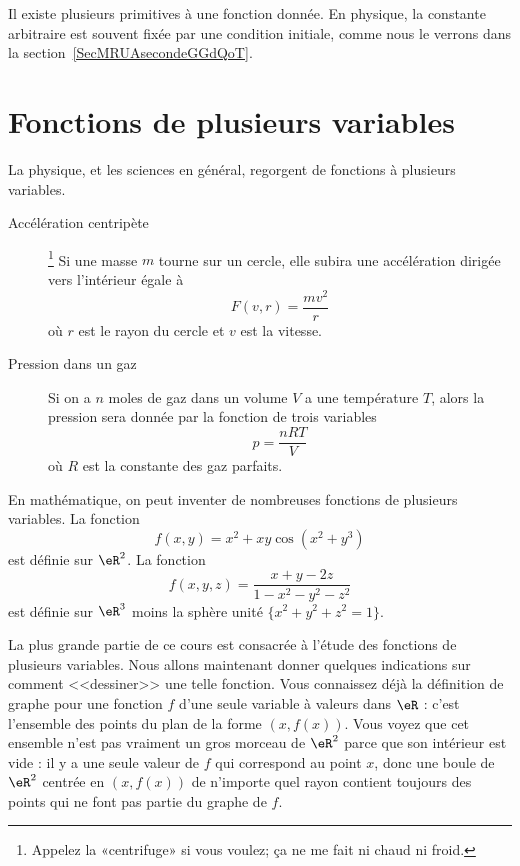 \begin{normaltext}
    Il existe plusieurs primitives à une fonction donnée. En physique, la constante arbitraire est souvent fixée par une condition initiale, comme nous le verrons dans la section~\ref{SecMRUAsecondeGGdQoT}.
\end{normaltext}

\section{Fonctions de plusieurs variables}

La physique, et les sciences en général, regorgent de fonctions à plusieurs variables.
\begin{description}
    \item[Accélération centripète]\footnote{Appelez la «centrifuge» si vous voulez; ça ne me fait ni chaud ni froid.}  Si une masse $m$ tourne sur un cercle, elle subira une accélération dirigée vers l'intérieur égale à
        \begin{equation}
            F(v,r)=\frac{ mv^2 }{ r }
        \end{equation}
        où $r$ est le rayon du cercle et $v$ est la vitesse.
    \item[Pression dans un gaz] Si on a $n$ moles de gaz dans un volume $V$ a une température $T$, alors la pression sera donnée par la fonction de trois variables
        \begin{equation}
            p=\frac{ nRT }{ V }
        \end{equation}
        où $R$ est la constante des gaz parfaits.
\end{description}

En mathématique, on peut inventer de nombreuses fonctions de plusieurs variables. La fonction
\begin{equation}
    f(x,y)=x^2+xy\cos(x^2+y^3)
\end{equation}
est définie sur $\eR^2$. La fonction
\begin{equation}
    f(x,y,z)=\frac{ x+y-2z }{ 1-x^2-y^2-z^2 }
\end{equation}
est définie sur $\eR^3$ moins la sphère unité $\{ x^2+y^2+z^2=1 \}$.

La plus grande partie de ce cours est consacrée à l'étude des fonctions de plusieurs variables. Nous allons maintenant donner quelques indications sur comment <<dessiner>> une telle fonction. Vous connaissez déjà la définition de graphe pour une fonction $f$ d'une seule variable à valeurs dans $\eR$ : c'est l'ensemble des points du plan de la forme $(x, f(x))$. Vous voyez que cet ensemble n'est pas vraiment un gros morceau de $\eR^2$ parce que son intérieur est vide : il y a une seule valeur de $f$ qui correspond au point $x$, donc une boule de $\eR^2$ centrée en $(x, f(x))$ de n'importe quel rayon contient toujours des points qui ne font pas partie du graphe de $f$.

